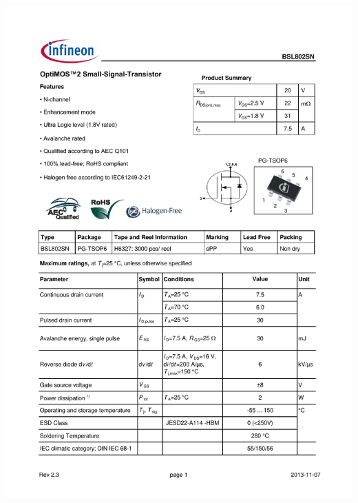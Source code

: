\documentclass{../../template/tp}
\begin{document}
\begin{center}
{\hspace{-1.5cm}\includegraphics[width=17cm,page=5]{Infineon-BSL802SN-DS-v01_00-en.pdf}}
\end{center}
\vspace{-4cm}
\end{document}
